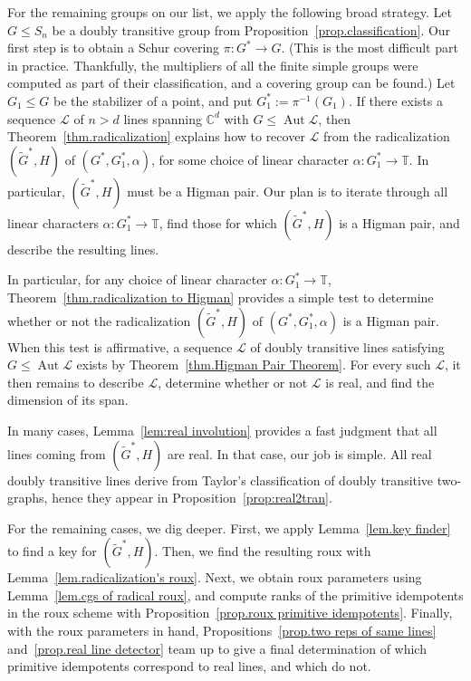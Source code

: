 For the remaining groups on our list, we apply the following broad strategy.
Let $G \leq S_n$ be a doubly transitive group from Proposition~\ref{prop.classification}.
Our first step is to obtain a Schur covering $\pi \colon G^* \to G$.
(This is the most difficult part in practice.
Thankfully, the multipliers of all the finite simple groups were computed as part of their classification, and a covering group can be found.)
Let $G_1 \leq G$ be the stabilizer of a point, and put $G_1^* := \pi^{-1}(G_1)$.
If there exists a sequence $\mathscr{L}$ of $n > d$ lines spanning $\mathbb{C}^d$ with $G \leq \operatorname{Aut}\mathscr{L}$, then Theorem~\ref{thm.radicalization} explains how to recover $\mathscr{L}$ from the radicalization~$(\widetilde{G}^*,H)$ of $(G^*,G_1^*,\alpha)$, for some choice of linear character $\alpha \colon G_1^* \to \mathbb{T}$.
In particular, $(\widetilde{G}^*,H)$ must be a Higman pair.
Our plan is to iterate through all linear characters $\alpha \colon G_1^* \to \mathbb{T}$, find those for which $(\widetilde{G}^*,H)$ is a Higman pair, and describe the resulting lines.

In particular, for any choice of linear character $\alpha \colon G_1^* \to \mathbb{T}$, Theorem~\ref{thm.radicalization to Higman} provides a simple test to determine whether or not the radicalization $(\widetilde{G}^*,H)$ of $(G^*,G_1^*,\alpha)$ is a Higman pair.
When this test is affirmative, a sequence $\mathscr{L}$ of doubly transitive lines satisfying $G \leq \operatorname{Aut} \mathscr{L}$ exists by Theorem~\ref{thm.Higman Pair Theorem}.
For every such $\mathscr{L}$, it then remains to describe $\mathscr{L}$, determine whether or not $\mathscr{L}$ is real, and find the dimension of its span.

In many cases, Lemma~\ref{lem:real involution} provides a fast judgment that all lines coming from $(\widetilde{G}^*,H)$ are real.
In that case, our job is simple.
All real doubly transitive lines derive from Taylor's classification of doubly transitive two-graphs, hence they appear in Proposition~\ref{prop:real2tran}.

For the remaining cases, we dig deeper.
First, we apply Lemma~\ref{lem.key finder} to find a key for $(\widetilde{G}^*,H)$.
Then, we find the resulting roux with Lemma~\ref{lem.radicalization's roux}.
Next, we obtain roux parameters using Lemma~\ref{lem.cgs of radical roux}, and compute ranks of the primitive idempotents in the roux scheme with Proposition~\ref{prop.roux primitive idempotents}.
Finally, with the roux parameters in hand, Propositions~\ref{prop.two reps of same lines} and~\ref{prop.real line detector} team up to give a final determination of which primitive idempotents correspond to real lines, and which do not.


